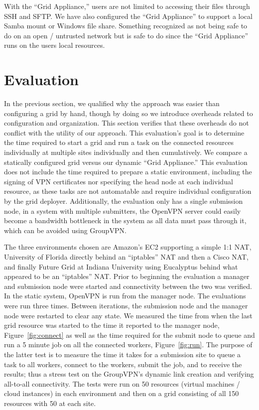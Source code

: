 \documentclass[conference]{IEEEtran}
\begin{document}
With the ``Grid Appliance,'' users are not limited to accessing their files
through SSH and SFTP.  We have also configured the ``Grid Appliance'' to
support a local Samba mount or Windows file share.  Something recognized as not
being safe to do on an open / untrusted network but is safe to do since the
``Grid Appliance'' runs on the users local resources.

\section{Evaluation}
\label{evaluation}

In the previous section, we qualified why the approach was easier than
configuring a grid by hand, though by doing so we introduce overheads related
to configuration and organization.  This section verifies that these overheads
do not conflict with the utility of our approach.  This evaluation's goal is to
determine the time required to start a grid and run a task on the connected
resources individually at multiple sites individually and then cumulatively.
We compare a statically configured grid versus our dynamic ``Grid Appliance.''
This evaluation does not include the time required to prepare a static
environment, including the signing of VPN certificates nor specifying the head
node at each individual resource, as these tasks are not automatable and
require individual configuration by the grid deployer.  Additionally, the
evaluation only has a single submission node, in a system with multiple
submitters, the OpenVPN server could easily become a bandwidth bottleneck in
the system as all data must pass through it, which can be avoided using
GroupVPN.

The three environments chosen are Amazon's EC2 supporting a simple 1:1 NAT,
University of Florida directly behind an ``iptables'' NAT and then a Cisco NAT,
and finally Future Grid at Indiana University using Eucalyptus behind what
appeared to be an ``iptables'' NAT.  Prior to beginning the evaluation a
manager and submission node were started and connectivity between the two was
verified.  In the static system, OpenVPN is run from the manager node.  The
evaluations were run three times.  Between iterations, the submission node and
the manager node were restarted to clear any state.  We measured the time from
when the last grid resource was started to the time it reported to the manager
node, Figure~\ref{fig:connect} as well as the time required for the submit node
to queue and run a 5 minute job on all the connected workers,
Figure~\ref{fig:run}.  The purpose of the latter test is to measure the time it
takes for a submission site to queue a task to all workers, connect to the
workers, submit the job, and to receive the results; thus a stress test on the
GroupVPN's dynamic link creation and verifying all-to-all connectivity.  The
tests were run on 50 resources (virtual machines / cloud instances) in each
environment and then on a grid consisting of all 150 resources with 50 at each
site.
\end{document}
